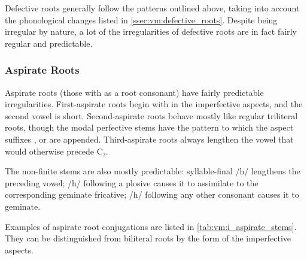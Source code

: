 \documentclass[grammar]{subfiles}
\begin{document}
Defective roots generally follow the patterns outlined above, taking into
account the phonological changes listed in \cref{ssec:vm:defective_roots}.
Despite being irregular by nature, a lot of the irregularities of defective
roots are in fact fairly regular and predictable. 


\subsubsection{Aspirate Roots}
\label{sssec:vm:i_aspirate}

Aspirate roots (those with  as a root consonant) have fairly predictable
irregularities.  First-aspirate roots begin with  in the imperfective
aspects, and the second vowel is short.  Second-aspirate roots behave mostly like
regular triliteral roots, though the modal perfective stems have the pattern
 to which the aspect suffixes ,  or  are appended.
Third-aspirate roots always lengthen the vowel that would otherwise precede C₃.  

The non-finite stems are also mostly predictable: syllable-final /h/ lengthens the
preceding vowel; /h/ following a plosive causes it to assimilate to the
corresponding geminate fricative; /h/ following any other consonant causes it
to geminate. 

Examples of aspirate root conjugations are listed in
\cref{tab:vm:i_aspirate_stems}.  They can be distinguished from biliteral roots
by the form of the imperfective aspects. 
\end{document}

